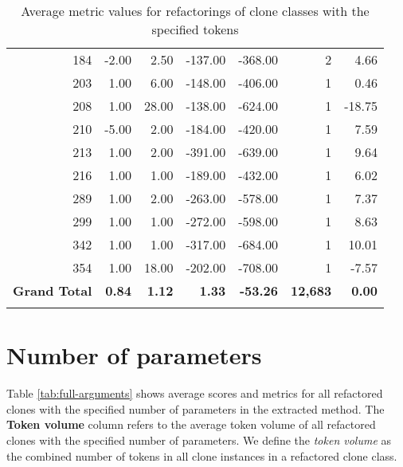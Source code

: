 \begin{appendices}
\begin{longtable}[c]{@{}rrrrrrr@{}}
184 & -2.00 & 2.50 & -137.00 & -368.00 & 2 & 4.66 \\

203 & 1.00 & 6.00 & -148.00 & -406.00 & 1 & 0.46 \\

208 & 1.00 & 28.00 & -138.00 & -624.00 & 1 & -18.75 \\

210 & -5.00 & 2.00 & -184.00 & -420.00 & 1 & 7.59 \\

213 & 1.00 & 2.00 & -391.00 & -639.00 & 1 & 9.64 \\

216 & 1.00 & 1.00 & -189.00 & -432.00 & 1 & 6.02 \\

289 & 1.00 & 2.00 & -263.00 & -578.00 & 1 & 7.37 \\

299 & 1.00 & 1.00 & -272.00 & -598.00 & 1 & 8.63 \\

342 & 1.00 & 1.00 & -317.00 & -684.00 & 1 & 10.01 \\

354 & 1.00 & 18.00 & -202.00 & -708.00 & 1 & -7.57 \\* \midrule
\textbf{Grand Total} & \textbf{0.84} & \textbf{1.12} & \textbf{1.33} & \textbf{-53.26} & \textbf{12,683} & \textbf{0.00} \\* \bottomrule
\caption{Average metric values for refactorings of clone classes with the specified tokens}
\label{tab:full-tokens}\\
\end{longtable}

\newpage

\section{Number of parameters}
Table \ref{tab:full-arguments} shows average scores and metrics for all refactored clones with the specified number of parameters in the extracted method. The \textbf{Token volume} column refers to the average token volume of all refactored clones with the specified number of parameters. We define the \textit{token volume} as the combined number of tokens in all clone instances in a refactored clone class.


\end{appendices}
